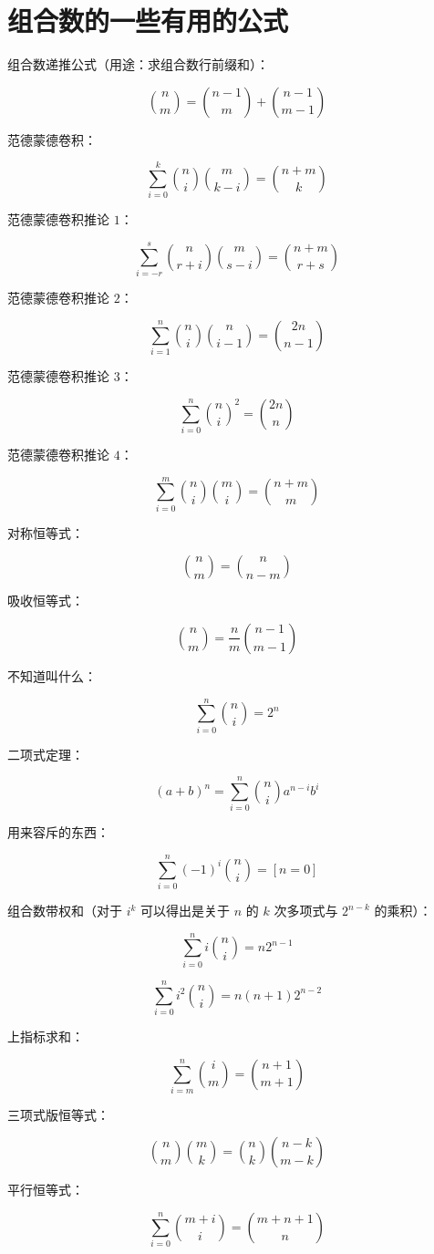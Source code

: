 \section{组合数的一些有用的公式}

组合数递推公式（用途：求组合数行前缀和）：

$$\binom{n}{m}=\binom{n-1}{m}+\binom{n-1}{m-1}$$

范德蒙德卷积：

$$\sum_{i=0}^k \binom{n}{i}\binom{m}{k-i}=\binom{n+m}{k}$$

范德蒙德卷积推论 $1$：

$$\sum_{i=-r}^s \binom{n}{r+i}\binom{m}{s-i}=\binom{n+m}{r+s}$$

范德蒙德卷积推论 $2$：

$$\sum_{i=1}^n \binom{n}{i}\binom{n}{i-1}=\binom{2n}{n-1}$$

范德蒙德卷积推论 $3$：

$$\sum_{i=0}^n \binom{n}{i}^2=\binom{2n}{n}$$

范德蒙德卷积推论 $4$：

$$\sum_{i=0}^m \binom{n}{i}\binom{m}{i}=\binom{n+m}{m}$$

对称恒等式：

$$\binom{n}{m}=\binom{n}{n-m}$$

吸收恒等式：

$$\binom{n}{m}=\frac{n}{m}\binom{n-1}{m-1}$$

不知道叫什么：

$$\sum_{i=0}^n \binom{n}{i}=2^n$$

二项式定理：

$$(a+b)^n=\sum_{i=0}^n \binom{n}{i}a^{n-i}b^i$$

用来容斥的东西：

$$\sum_{i=0}^n (-1)^i \binom{n}{i}=[n=0]$$

组合数带权和（对于 $i^k$ 可以得出是关于 $n$ 的 $k$ 次多项式与 $2^{n-k}$ 的乘积）：

$$\sum_{i=0}^n i \binom{n}{i}=n2^{n-1}$$

$$\sum_{i=0}^n i^2 \binom{n}{i}=n(n+1)2^{n-2}$$

上指标求和：

$$\sum_{i=m}^n \binom{i}{m}=\binom{n+1}{m+1}$$

三项式版恒等式：

$$\binom{n}{m}\binom{m}{k}=\binom{n}{k}\binom{n-k}{m-k}$$

平行恒等式：

$$\sum_{i=0}^n \binom{m+i}{i}=\binom{m+n+1}{n}$$

